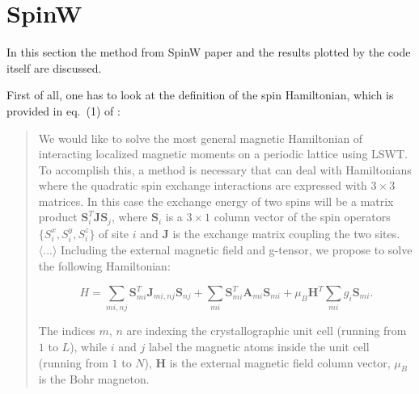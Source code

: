 \documentclass[a4paper,12pt]{article}
\begin{document}
    \section{SpinW}\label{sec:spinw}
        In this section the method from SpinW paper \cite{toth2015linear} and the results plotted by the code \cite{SpinW} itself are discussed.

        First of all, one has to look at the definition of the spin Hamiltonian, which is provided in eq.~(1) of \cite{toth2015linear}:
        \begin{quote}
            We would like to solve the most general magnetic Hamiltonian
            of interacting localized magnetic moments on a periodic lattice
            using LSWT. To accomplish this, a method is necessary that
            can deal with Hamiltonians where the quadratic spin exchange
            interactions are expressed with $3 \times 3$ matrices. In this case
            the exchange energy of two spins will be a matrix product
            $\mathbf{S}_i^T\mathbf{J}\mathbf{S}_j$, where $\mathbf{S}_i$ is a $3 \times 1$ column vector of the spin operators
            $\{S_i^x, S_i^y, S_i^z\}$ of site $i$ and $\mathbf{J}$ is the exchange matrix coupling
            the two sites. $\langle ... \rangle$ Including the external magnetic field and g-tensor, we
            propose to solve the following Hamiltonian:

            \begin{equation}
                H = \sum_{mi,nj} \mathbf{S}_{mi}^T \mathbf{J}_{mi,nj}\mathbf{S}_{nj} 
                + \sum_{mi} \mathbf{S}_{mi}^T \mathbf{A}_{mi}\mathbf{S}_{mi} + \mu_B\mathbf{H}^T\sum_{mi}g_i\mathbf{S}_{mi}.
                \tag{(1)}
            \end{equation}
            
            The indices $m$, $n$ are indexing the crystallographic unit cell
            (running from $1$ to $L$), while $i$ and $j$ label the magnetic atoms inside the unit cell (running from $1$ to $N$), $\mathbf{H}$ is the external
            magnetic field column vector, $\mu_B$ is the Bohr magneton.
        \end{quote}
\end{document}
